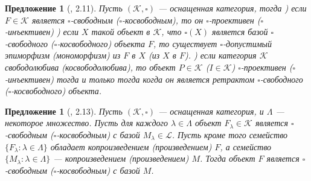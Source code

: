 \documentclass[12pt]{article}
\newtheorem{proposition}[theorem]{Предложение}
\begin{document}
\begin{proposition}[\cite{HelMetrFrQmod}, 2.11]\label{PrFrCoFrProjInjObjProp} Пусть $(\mathcal{K},\square)$ --- оснащенная категория, тогда
) если $F\in\mathcal{K}$ является $\square$-свободным ($\square$-косвободным), то он $\square$-проективен ($\square$-инъективен)
) если $X$ такой объект в $\mathcal{K}$, что $\square(X)$ является базой $\square$-свободного ($\square$-косвободного) объекта $F$, то существует $\square$-допустимый эпиморфизм (мономорфизм) из $F$ в $X$ (из $X$ в $F$).
) если категория $\mathcal{K}$ свободолюбива (косвободолюбива), то объект $P\in\mathcal{K}$ ($I\in\mathcal{K}$) $\square$-проективен ($\square$-инъективен) тогда и только тогда когда он является ретрактом $\square$-свободного ($\square$-косвободного) объекта.
\end{proposition}

\begin{proposition}[\cite{HelMetrFrQmod}, 2.13]\label{PrCoprodFrIsFr} Пусть $(\mathcal{K},\square)$ --- оснащенная категория, и $\Lambda$ --- некоторое множество. Пусть для 
каждого $\lambda \in \Lambda$ объект $F_{\lambda} \in \mathcal{K}$ является $\square$-свободным ($\square$-косвободным) с базой $M_{\lambda} \in \mathcal{L}$. Пусть кроме того 
семейство $\{ F_\lambda:\lambda \in \Lambda\}$ обладает копроизведением (произведением) $F$, а семейство $\{ M_\lambda:\lambda \in \Lambda\}$ --- копроизведением (произведением) $M$. 
Тогда объект $F$ является $\square$-свободным ($\square$-косвободным) с базой $M$.
\end{proposition}
\end{document}
